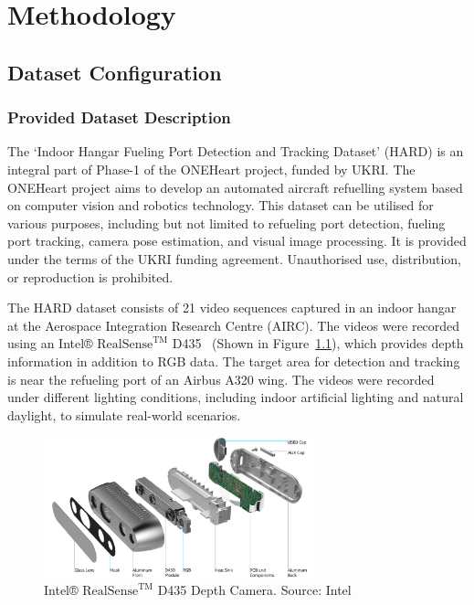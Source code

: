 \documentclass[12pt,oneside]{book} %
\begin{document}
\chapter{Methodology}\label{chap:methodology}
\section{Dataset Configuration}
\subsection{Provided Dataset Description}
The `Indoor Hangar Fueling Port Detection and Tracking Dataset' (HARD) is an
integral part of Phase-1 of the ONEHeart project, funded by UKRI. The ONEHeart
project aims to develop an automated aircraft refuelling system based on
computer vision and robotics technology. This dataset can be utilised for
various purposes, including but not limited to refueling port detection,
fueling port tracking, camera pose estimation, and visual image processing. It
is provided under the terms of the UKRI funding agreement. Unauthorised use,
distribution, or reproduction is prohibited.

The HARD dataset consists of 21 video sequences captured in an indoor hangar at
the Aerospace Integration Research Centre (AIRC). The videos were recorded
using an Intel® ${\text{RealSense}}^{\text{TM}}$ D435~\cite{IntelRealSense}
(Shown in Figure~\ref{fig:intel-realsense-d435}), which provides depth
information in addition to RGB data. The target area for detection and tracking
is near the refueling port of an Airbus A320 wing. The videos were recorded
under different lighting conditions, including indoor artificial lighting and
natural daylight, to simulate real-world scenarios.

\begin{figure}[H]
    \centering
    \includegraphics[width=0.7\textwidth]{figures/depth-camera-d435_details.jpg}
    \caption{Intel® ${\text{RealSense}}^{\text{TM}}$ D435 Depth Camera. Source: Intel}\label{fig:intel-realsense-d435}
\end{figure}
\end{document}
